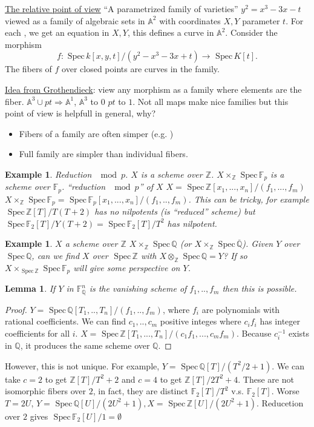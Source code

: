 \documentclass[11pt]{article}
\newtheorem{lemma}[thm]{Lemma}
\newtheorem{ex}[thm]{Example}
\newcommand{\spec}{\text{ Spec}\,}
\newcommand{\affn}{\mathbb A}
\newcommand{\intg}{\mathbb Z}
\newcommand{\bbf}{\mathbb F}
\newcommand{\ratl}{\mathbb Q}
\newcommand{\Lrta}{\Longrightarrow}
\newcommand{\lrta}{\longrightarrow}
\begin{document}
\underline{The relative point of view}
``A parametrized family of varieties''
$y^2=x^3-3x-t$ viewed as a family of algebraic sets in $\affn^2$ with coordinates $X,Y$ parameter $t$. For each %
, we get an equation in $X,Y$, this defines a curve in $\affn^2$. Consider the morphism
$$
f:\spec k[x,y,t]/(y^2-x^3-3x+t)\lrta \spec K[t].
$$
The fibers of $f$ over closed points are curves in the family.

\underline{Idea from Grothendieck}: view any morphism as a family where elements are the fiber. $\affn^3\cup pt\Lrta \affn^1$, $\affn^3$ to $0$ $pt$ to $1$. Not all maps make  nice families but this point of view is helpfull in general, why?
\begin{itemize}
	\item Fibers of a  family are often simper (e.g. )
	\item Full family are simpler than individual fibers.
\end{itemize}

\begin{ex}
Reduction $\mod p$. $X$ is a scheme over $\intg$. $X\times_\intg \spec \bbf_p$ is a scheme over $\bbf_p$. ``reduction $\mod p$'' of $X$
$X=\spec \intg[x_1,...,x_n]/(f_1,...,f_m)$
$X\times_\intg\spec \bbf_p=\spec \bbf_p[x_1,...,x_n]/(f_1,..,f_m)$. This can be tricky, for example $\spec \intg[T]/T(T+2)$ has no nilpotents (is ``reduced'' scheme) but $\spec \bbf_2[T]/Y(T+2)=\spec \bbf_2[T]/T^2$ has nilpotent. 
\end{ex}
\begin{ex}
$X$ a scheme over $\intg$
$X\times_\intg \spec \ratl$ (or $X\times_\intg \spec \overline{\ratl}$). Given $Y$ over $\spec \ratl$, can we find $X$ over $\spec \intg$ with $X\otimes_\intg \spec \ratl=Y$? If so $X\times_{\spec \intg} \spec \bbf_p$ will give some perspective on $Y$.
\end{ex}
\begin{lemma}
If $Y$ in $\bbf^n_\ratl$ is the vanishing scheme of $f_1,..,f_m$ then this is possible.
\end{lemma}
\begin{proof}
$Y=\spec \ratl[T_1,..,T_n]/(f_1,..,f_m)$, where $f_i$ are polynomials with rational coefficients. We can find $c_1,..,c_m$ positive integes where $c_if_i$ has integer coefficients for all $i$. $X=\spec \intg[T_1,...,T_n]/(c_1f_1,...,c_mf_m)$. Because $c_i^{-1}$ exists in $\ratl$, it produces the same scheme over $\ratl$. 

\end{proof}
However, this is not unique. For example, $Y=\spec \ratl[T]/(T^2/2+1)$. We can take $c=2$ to get $\intg[T]/T^2+2$ and $c=4$ to get $\intg[T]/2T^2+4$. These are not isomorphic fibers over $2$, in fact, they are distinct
$\bbf_2[T]/T^2$ v.s. $\bbf_2[T]$. Worse $T=2U$, $Y=\spec \ratl[U]/(2U^2+1), X=\spec \intg[U]/(2U^2+1)$. Reducetion over $2$ gives $\spec \bbf_2[U]/1=\emptyset$ 
\end{document}
